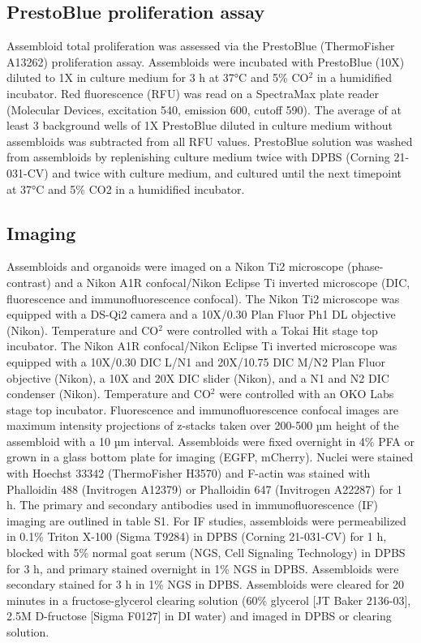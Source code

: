 \begin{refsection}
    \subsection{PrestoBlue proliferation assay}
    Assembloid total proliferation was assessed via the PrestoBlue (ThermoFisher A13262) proliferation assay. Assembloids were incubated with PrestoBlue (10X) diluted to 1X in culture medium for 3 h at 37°C and 5\% CO$^2$ in a humidified incubator. Red fluorescence (RFU) was read on a SpectraMax plate reader (Molecular Devices, excitation 540, emission 600, cutoff 590). The average of at least 3 background wells of 1X PrestoBlue diluted in culture medium without assembloids was subtracted from all RFU values. PrestoBlue solution was washed from assembloids by replenishing culture medium twice with DPBS (Corning 21-031-CV) and twice with culture medium, and cultured until the next timepoint at 37°C and 5\% CO2 in a humidified incubator.
    
    \subsection{Imaging}
    Assembloids and organoids were imaged on a Nikon Ti2 microscope (phase-contrast) and a Nikon A1R confocal/Nikon Eclipse Ti inverted microscope (DIC, fluorescence and immunofluorescence confocal). The Nikon Ti2 microscope was equipped with a DS-Qi2 camera and a 10X/0.30 Plan Fluor Ph1 DL objective (Nikon). Temperature and CO$^2$ were controlled with a Tokai Hit stage top incubator. The Nikon A1R confocal/Nikon Eclipse Ti inverted microscope was equipped with a 10X/0.30 DIC L/N1 and 20X/10.75 DIC M/N2 Plan Fluor objective (Nikon), a 10X and 20X DIC slider (Nikon), and a N1 and N2 DIC condenser (Nikon). Temperature and CO$^2$ were controlled with an OKO Labs stage top incubator.
    Fluorescence and immunofluorescence confocal images are maximum intensity projections of z-stacks taken over 200-500 µm height of the assembloid with a 10 µm interval. Assembloids were fixed overnight in 4\% PFA or grown in a glass bottom plate for imaging (EGFP, mCherry). Nuclei were stained with Hoechst 33342 (ThermoFisher H3570) and F-actin was stained with Phalloidin 488 (Invitrogen A12379) or Phalloidin 647 (Invitrogen A22287) for 1 h. The primary and secondary antibodies used in immunofluorescence (IF) imaging are outlined in table S1. For IF studies, assembloids were permeabilized in 0.1\% Triton X-100 (Sigma T9284) in DPBS (Corning 21-031-CV) for 1 h, blocked with 5\% normal goat serum (NGS, Cell Signaling Technology) in DPBS for 3 h, and primary stained overnight in 1\% NGS in DPBS. Assembloids were secondary stained for 3 h in 1\% NGS in DPBS. Assembloids were cleared for 20 minutes in a fructose-glycerol clearing solution\cite{dekkers2019a} (60\% glycerol [JT Baker 2136-03], 2.5M D-fructose [Sigma F0127] in DI water) and imaged in DPBS or clearing solution. 


\end{refsection}
